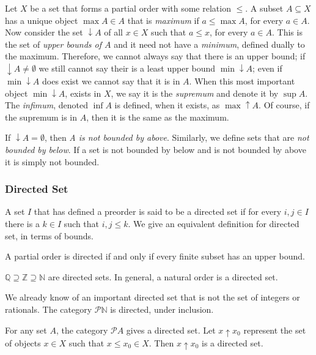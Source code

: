 \documentclass [12pt]{book}
\begin{document}
Let $X$ be a set that forms a partial order with some relation $\leq$. A subset $A\subseteq X$ has a unique object $\max A\in A$ that is \textit{maximum} if $a\leq\max A$, for every $a\in A$. Now consider the set $\downarrow A$ of all $x\in X$ such that $a\leq x$, for every $a\in A$. This is the set of \textit{upper bounds of $A$} and it need not have a \textit{minimum}, defined dually to the maximum. Therefore, we cannot always say that there is an upper bound; if $\downarrow A\neq\emptyset$ we still cannot say their is a least upper bound $\min \downarrow A$; even if $\min \downarrow A$ does exist we cannot say that it is in $A$. When this most important object $\min\downarrow A$, exists in $X$, we say it is the \textit{supremum} and denote it by $\sup A$. The \textit{infimum}, denoted $\inf A$ is defined, when it exists, as $\max \uparrow A$. Of course, if the supremum is  in $A$, then it is the same as the maximum. 

If $\downarrow A=\emptyset$, then \textit{A is not bounded by above}. Similarly, we define sets that are \textit{not bounded by below}. If a set is not bounded by below and is not bounded by above it is simply not bounded.

		\subsubsection{Directed Set}

A set $I$ that has defined a preorder is said to be a directed set if for every $i,j\in I$ there is a $k\in I$ such that $i,j\leq k$. We give an equivalent definition for directed set, in terms of bounds.

\begin{proposition}A partial order is directed if and only if every finite subset has an upper bound.\end{proposition}

\begin{proposition}$\mathbb{Q}\supseteq\mathbb{Z}\supseteq\mathbb{N}$ are directed sets. In general, a natural order is a directed set.\end{proposition}
We already know of an important directed set that is not the set of integers or rationals. The category $\mathcal{P}\mathbb{N}$ is directed, under inclusion.

\begin{proposition}For any set $A$, the category $\mathcal{P}A$ gives a directed set. Let $x\uparrow x_0$ represent the set of objects $x\in X$ such that $x\leq x_0\in X$. Then $x\uparrow x_0$ is a directed set.\end{proposition}
\end{document}
